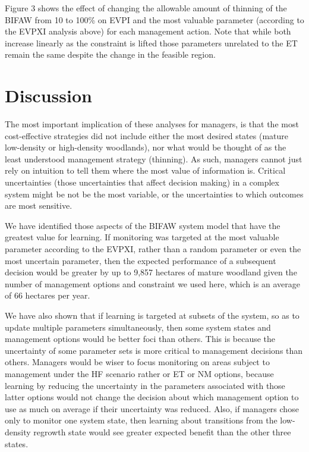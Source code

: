 \documentclass[]{article}
\begin{document}
Figure 3 shows the effect of changing the allowable amount of thinning
of the BIFAW from 10 to 100\% on EVPI and the most valuable parameter
(according to the EVPXI analysis above) for each management action. Note
that while both increase linearly as the constraint is lifted those
parameters unrelated to the ET remain the same despite the change in the
feasible region.

\newpage

\section{Discussion}\label{discussion}

The most important implication of these analyses for managers, is that
the most cost-effective strategies did not include either the most
desired states (mature low-density or high-density woodlands), nor what
would be thought of as the least understood management strategy
(thinning). As such, managers cannot just rely on intuition to tell them
where the most value of information is. Critical uncertainties (those
uncertainties that affect decision making) in a complex system might be
not be the most variable, or the uncertainties to which outcomes are
most sensitive.

We have identified those aspects of the BIFAW system model that have the
greatest value for learning. If monitoring was targeted at the most
valuable parameter according to the EVPXI, rather than a random
parameter or even the most uncertain parameter, then the expected
performance of a subsequent decision would be greater by up to 9,857
hectares of mature woodland given the number of management options and
constraint we used here, which is an average of 66 hectares per year.

We have also shown that if learning is targeted at subsets of the
system, so as to update multiple parameters simultaneously, then some
system states and management options would be better foci than others.
This is because the uncertainty of some parameter sets is more critical
to management decisions than others. Managers would be wiser to focus
monitoring on areas subject to management under the HF scenario rather
or ET or NM options, because learning by reducing the uncertainty in the
parameters associated with those latter options would not change the
decision about which management option to use as much on average if
their uncertainty was reduced. Also, if managers chose only to monitor
one system state, then learning about transitions from the low-density
regrowth state would see greater expected benefit than the other three
states.
\end{document}
